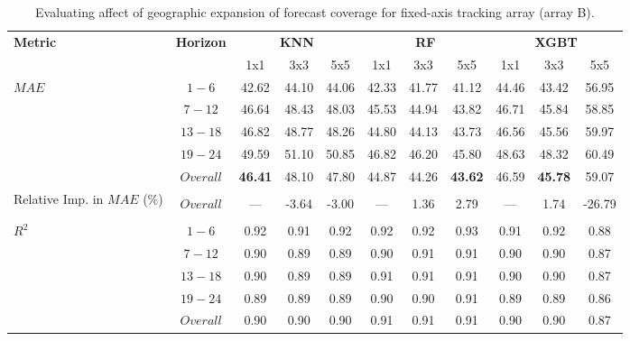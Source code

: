 \begin{table}[h]
\begin{center}
    \caption{Evaluating affect of geographic expansion of forecast coverage for fixed-axis tracking array (array B).}
    \begin{tabular}{l c c c c c c c c c c}
        \toprule
        \multirow{2}{*}{\textbf{Metric}} & \multirow{2}{*}{\textbf{Horizon}} & \multicolumn{3}{c}{\textbf{KNN}} & \multicolumn{3}{c}{\textbf{RF}} & \multicolumn{3}{c}{\textbf{XGBT}}\\
        \cmidrule{3-11}
         &  & 1x1 & 3x3 & 5x5 & 1x1 & 3x3 & 5x5 & 1x1 & 3x3 & 5x5 \\
        \midrule
        \multirow{5}{*}{$MAE$} & $1 - 6$ & 42.62 & 44.10 & 44.06 & 42.33 & 41.77 & 41.12 & 44.46 & 43.42 & 56.95 \\
        & $7 - 12$ & 46.64 & 48.43 & 48.03 & 45.53 & 44.94 & 43.82 & 46.71 & 45.84 & 58.85 \\
        & $13 - 18$ & 46.82 & 48.77 & 48.26 & 44.80 & 44.13 & 43.73 & 46.56 & 45.56 & 59.97 \\
        & $19 - 24$ & 49.59 & 51.10 & 50.85 & 46.82 & 46.20 & 45.80 & 48.63 & 48.32 & 60.49 \\
        & $Overall$ & \textbf{46.41} & 48.10 & 47.80 & 44.87 & 44.26 & \textbf{43.62} & 46.59 & \textbf{45.78} & 59.07 \\
        \midrule
        \multirow{3}{5em}{Relative Imp. in $MAE$ (\%)} & & & & & & & & & & \\ 
        & $Overall$ & --- & -3.64 & -3.00 & --- & 1.36 & 2.79 & --- & 1.74 & -26.79 \\
        & & & & & & & & & & \\
        \midrule
        \multirow{5}{*}{$R^2$} & $1 - 6$ & 0.92 & 0.91 & 0.92 & 0.92 & 0.92 & 0.93 & 0.91 & 0.92 & 0.88 \\
        & $7 - 12$ & 0.90 & 0.89 & 0.89 & 0.90 & 0.91 & 0.91 & 0.90 & 0.90 & 0.87 \\
        & $13 - 18$ & 0.90 & 0.89 & 0.89 & 0.91 & 0.91 & 0.91 & 0.90 & 0.90 & 0.87 \\
        & $19 - 24$ & 0.89 & 0.89 & 0.89 & 0.90 & 0.90 & 0.91 & 0.89 & 0.89 & 0.86 \\
        & $Overall$ & 0.90 & 0.90 & 0.90 & 0.91 & 0.91 & 0.91 & 0.90 & 0.90 & 0.87 \\
        \bottomrule
    \end{tabular}
\end{center}
\end{table}

